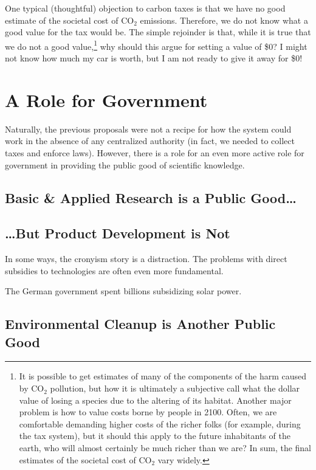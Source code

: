 One typical (thoughtful) objection to carbon taxes is that we have no good
estimate of the societal cost of CO${}_2$ emissions. Therefore, we do not know
what a good value for the tax would be. The simple rejoinder is that, while it
is true that we do not a good value,\footnote{It is possible to get estimates
of many of the components of the harm caused by CO${}_2$ pollution, but how it
is ultimately a subjective call what the dollar value of losing a species due
to the altering of its habitat. Another major problem is how to value costs
borne by people in 2100. Often, we are comfortable demanding higher costs of
the richer folks (for example, during the tax system), but it should this apply
to the future inhabitants of the earth, who will almost certainly be much
richer than we are? In sum, the final estimates of the societal cost of
CO${}_2$ vary widely.} why should this argue for setting a value of \$0? I
might not know how much my car is worth, but I am not ready to give it away for
\$0!

\section{A Role for Government}

Naturally, the previous proposals were not a recipe for how the system could
work in the absence of any centralized authority (in fact, we needed to collect
taxes and enforce laws). However, there is a role for an even more active role
for government in providing the public good of scientific knowledge.

\subsection{Basic \& Applied Research is a Public Good\ldots}

\subsection{\ldots But Product Development is Not}

In some ways, the cronyism story is a distraction. The problems with direct
subsidies to technologies are often even more fundamental.

The German government spent billions subsidizing solar power.

\subsection{Environmental Cleanup is Another Public Good}

